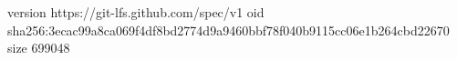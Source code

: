 version https://git-lfs.github.com/spec/v1
oid sha256:3ecac99a8ca069f4df8bd2774d9a9460bbf78f040b9115cc06e1b264cbd22670
size 699048
